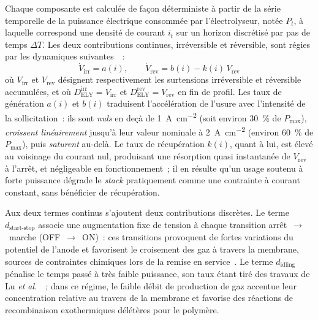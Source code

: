 Chaque composante est calculée de façon déterministe à partir de la série temporelle de la puissance électrique consommée par l'électrolyseur, notée $P_t$, à laquelle correspond une densité de courant $i_t$ sur un horizon discrétisé par pas de temps $\Delta T$. Les deux contributions continues, irréversible et réversible, sont régies par les dynamiques suivantes~\cite{rakousky_polymer_2017}~:
\begin{equation}
    \dot{V}_{\text{irr}} = a(i), \qquad
    \dot{V}_{\text{rev}} = b(i) - k(i)\, V_{\text{rev}}
    \label{eq:ely_irr_rev}
\end{equation}
où $V_{\text{irr}}$ et $V_{\text{rev}}$ désignent respectivement les surtensions irréversible et réversible accumulées, et où $D_{\text{ELY}}^{\text{irr}} = V_{\text{irr}}$ et $D_{\text{ELY}}^{\text{rev}} = V_{\text{rev}}$ en fin de profil. Les taux de génération $a(i)$ et $b(i)$ traduisent l'accélération de l'usure avec l'intensité de la sollicitation~: ils sont \emph{nuls} en deçà de \SI{1}{\ampere\per\centi\meter\squared} (soit environ \SI{30}{\percent} de $P_{\text{max}}$), \emph{croissent linéairement} jusqu'à leur valeur nominale à \SI{2}{\ampere\per\centi\meter\squared} (environ \SI{60}{\percent} de $P_{\text{max}}$), puis \emph{saturent} au-delà. Le taux de récupération $k(i)$, quant à lui, est élevé au voisinage du courant nul, produisant une résorption quasi instantanée de $V_{\text{rev}}$ à l'arrêt, et négligeable en fonctionnement~; il en résulte qu'un usage soutenu à forte puissance dégrade le \textit{stack} pratiquement comme une contrainte à courant constant, sans bénéficier de récupération.

Aux deux termes continus s'ajoutent deux contributions discrètes. Le terme $d_{\text{start-stop}}$ associe une augmentation fixe de tension à chaque transition arrêt~$\rightarrow$~marche (OFF~$\rightarrow$~ON)~: ces transitions provoquent de fortes variations du potentiel de l'anode et favorisent le croisement des gaz à travers la membrane, sources de contraintes chimiques lors de la remise en service~\cite{kuhnert_impact_2024}. Le terme $d_{\text{idling}}$ pénalise le temps passé à très faible puissance, son taux étant tiré des travaux de Lu \textit{et al.}~\cite{lu_optimization_2023}~; dans ce régime, le faible débit de production de gaz accentue leur concentration relative au travers de la membrane et favorise des réactions de recombinaison exothermiques délétères pour le polymère.

